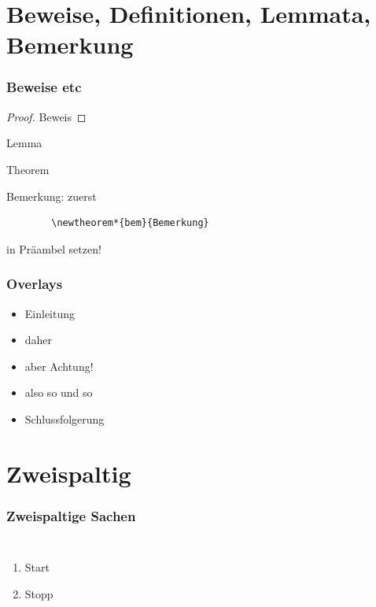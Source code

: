 \section{Beweise, Definitionen, Lemmata, Bemerkung}
\begin{frame}[fragile]
	\frametitle{Beweise etc}

    \begin{proof}
        Beweis
    \end{proof}
    
    \begin{lemma}
        Lemma
    \end{lemma}
    
    \begin{theorem}
        Theorem
    \end{theorem}
    
     \begin{bem}
	Bemerkung: zuerst 
	  \begin{verbatim}
	    \newtheorem*{bem}{Bemerkung}
	  \end{verbatim}
	  in Präambel setzen! 
     \end{bem}
\end{frame}

\begin{frame}
	\frametitle{Overlays}
   \begin{itemize}
        \item Einleitung
        \item<2-> daher
        \item<alert@3> aber Achtung!
        \item<3-> also so und so
        \item<4-> Schlussfolgerung
   \end{itemize}
\end{frame}


\section{Zweispaltig}
\begin{frame}
	\frametitle{Zweispaltige Sachen}
    \begin{columns}
                 \begin{enumerate}
                 \item Start
                 \item Stopp
                 \end{enumerate}
    \end{columns}
\end{frame}






